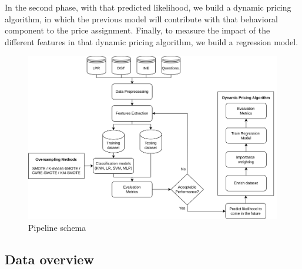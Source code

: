 \documentclass[12pt]{book}
\begin{document}
In the second phase, with that predicted likelihood, we build a dynamic pricing algorithm, in which the previous model will contribute with that behavioral component to the price assignment. Finally, to measure the impact of the different features in that dynamic pricing algorithm, we build a regression model.
\begin{figure}[H]
    \centering
    \includegraphics[width=1\linewidth]{figures/pipeline.png}
    \caption{Pipeline schema}
    \label{fig:pipeline}
\end{figure}


\subsection{Data overview} \label{sec:data_overview}
\end{document}
